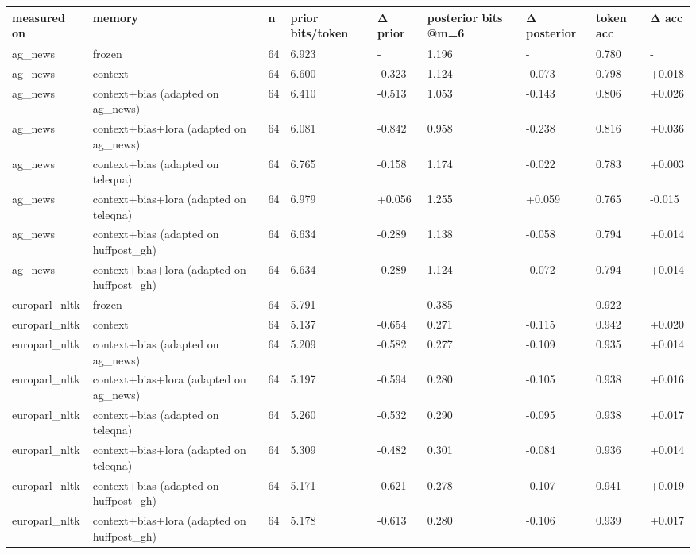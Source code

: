 \begin{tabular}{lllllllll}
\hline
measured on & memory & n & prior bits/token & Δ prior & posterior bits @m=6 & Δ posterior & token acc & Δ acc \\
\hline
ag\_news & frozen & 64 & 6.923 & - & 1.196 & - & 0.780 & - \\
ag\_news & context & 64 & 6.600 & -0.323 & 1.124 & -0.073 & 0.798 & +0.018 \\
ag\_news & context+bias (adapted on ag\_news) & 64 & 6.410 & -0.513 & 1.053 & -0.143 & 0.806 & +0.026 \\
ag\_news & context+bias+lora (adapted on ag\_news) & 64 & 6.081 & -0.842 & 0.958 & -0.238 & 0.816 & +0.036 \\
ag\_news & context+bias (adapted on teleqna) & 64 & 6.765 & -0.158 & 1.174 & -0.022 & 0.783 & +0.003 \\
ag\_news & context+bias+lora (adapted on teleqna) & 64 & 6.979 & +0.056 & 1.255 & +0.059 & 0.765 & -0.015 \\
ag\_news & context+bias (adapted on huffpost\_gh) & 64 & 6.634 & -0.289 & 1.138 & -0.058 & 0.794 & +0.014 \\
ag\_news & context+bias+lora (adapted on huffpost\_gh) & 64 & 6.634 & -0.289 & 1.124 & -0.072 & 0.794 & +0.014 \\
europarl\_nltk & frozen & 64 & 5.791 & - & 0.385 & - & 0.922 & - \\
europarl\_nltk & context & 64 & 5.137 & -0.654 & 0.271 & -0.115 & 0.942 & +0.020 \\
europarl\_nltk & context+bias (adapted on ag\_news) & 64 & 5.209 & -0.582 & 0.277 & -0.109 & 0.935 & +0.014 \\
europarl\_nltk & context+bias+lora (adapted on ag\_news) & 64 & 5.197 & -0.594 & 0.280 & -0.105 & 0.938 & +0.016 \\
europarl\_nltk & context+bias (adapted on teleqna) & 64 & 5.260 & -0.532 & 0.290 & -0.095 & 0.938 & +0.017 \\
europarl\_nltk & context+bias+lora (adapted on teleqna) & 64 & 5.309 & -0.482 & 0.301 & -0.084 & 0.936 & +0.014 \\
europarl\_nltk & context+bias (adapted on huffpost\_gh) & 64 & 5.171 & -0.621 & 0.278 & -0.107 & 0.941 & +0.019 \\
europarl\_nltk & context+bias+lora (adapted on huffpost\_gh) & 64 & 5.178 & -0.613 & 0.280 & -0.106 & 0.939 & +0.017 \\

\end{tabular}
